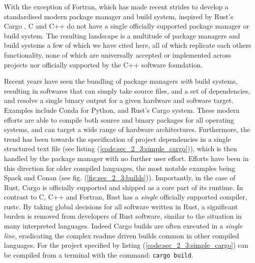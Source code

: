 With the exception of Fortran, which has made recent strides to develop a standardised modern package manager and build system, inspired by Rust's Cargo \cite{fpm2022github}, C and C++ do not have a single officially supported package manager or build system. The resulting landscape is a multitude of package managers \cite{spack2022github, vcpkg2022github, conan2022github} and build systems \cite{meson2022github, bazel2022github, scons2022github} a few of which we have cited here, all of which replicate each others functionality, none of which are universally accepted or implemented across projects nor officially supported by the C++ software foundation.


Recent years have seen the bundling of package managers \textit{with} build systems, resulting in softwares that can simply take source files, and a set of dependencies, and resolve a single binary output for a given hardware and software target. Examples include Conda for Python, and Rust's Cargo system. These modern efforts are able to compile both source and binary packages for all operating systems, and can target a wide range of hardware architectures. Furthermore, the trend has been towards the specification of project dependencies in a single structured text file (see listing (\ref{code:sec_2_3:simple_cargo})), which is then handled by the package manager with no further user effort. Efforts have been in this direction for older compiled languages, the most notable examples being Spack and Conan (see fig. (\ref{fig:sec_2_3:builds})). Importantly, in the case of Rust, Cargo is officially supported and shipped as a core part of its runtime. In contrast to C, C++ and Fortran, Rust has a \textit{single} officially supported compiler, rustc. By taking global decisions for all software written in Rust, a significant burden is removed from developers of Rust software, similar to the situation in many interpreted languages. Indeed Cargo builds are often executed in a \textit{single line}, eradicating the complex readme driven builds common in other compiled languages. For the project specified by listing (\ref{code:sec_2_3:simple_cargo}) can be compiled from a terminal with the command: \texttt{cargo build}.


